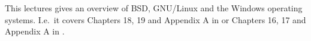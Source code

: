 This lectures gives an overview of BSD, GNU/Linux and the Windows operating 
systems.
I.e.\ it covers Chapters 18, 19 and Appendix A in \cite{Silberschatz2013osc} or 
Chapters 16, 17 and Appendix A in \cite{Silberschatz2013intl}.

